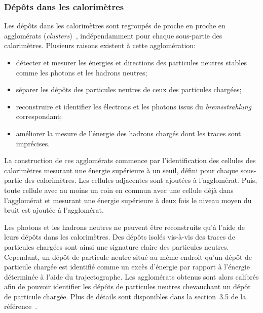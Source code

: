 \subsubsection{Dépôts dans les calorimètres}
Les dépôts dans les calorimètres sont regroupés de proche en proche en agglomérats (\emph{clusters})~\cite{particle-flow}, indépendamment pour chaque sous-partie des calorimètres.
Plusieurs raisons existent à cette agglomération:
\begin{itemize}
\item détecter et mesurer les énergies et directions des particules neutres stables comme les photons et les hadrons neutres;
\item séparer les dépôts des particules neutres de ceux des particules chargées;
\item reconstruire et identifier les électrons et les photons issus du \emph{bremsstrahlung} correspondant;
\item améliorer la mesure de l'énergie des hadrons chargés dont les traces sont imprécises.
\end{itemize}
\par La construction de ces agglomérats commence par l'identification des cellules des calorimètres mesurant une énergie supérieure à un seuil, défini pour chaque sous-partie des calorimètres.
Les cellules adjacentes sont ajoutées à l'agglomérat.
Puis, toute cellule avec au moins un coin en commun avec une cellule déjà dans l'agglomérat et mesurant une énergie supérieure à deux fois le niveau moyen du bruit est ajoutée à l'agglomérat.
\par Les photons et les hadrons neutres ne peuvent être reconstruits qu'à l'aide de leurs dépôts dans les calorimètres.
Des dépôts isolés vis-à-vis des traces de particules chargées sont ainsi une signature claire des particules neutres.
Cependant, un dépôt de particule neutre situé au même endroit qu'un dépôt de particule chargée est identifié comme un excès d'énergie par rapport à l'énergie déterminée à l'aide du trajectographe.
Les agglomérats obtenus sont alors calibrés afin de pouvoir identifier les dépôts de particules neutres chevauchant un dépôt de particule chargée.
Plus de détails sont disponibles dans la section~3.5 de la référence~\cite{particle-flow}.